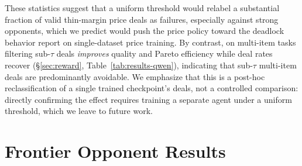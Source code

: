 \documentclass[11pt]{article}
\begin{document}
These statistics suggest that a uniform threshold would relabel a substantial fraction of valid thin-margin price deals as failures, especially against strong opponents, which we predict would push the price policy toward the deadlock behavior \citet{liu2026instructing} report on single-dataset price training. By contrast, on multi-item tasks filtering sub-$\tau$ deals \emph{improves} quality and Pareto efficiency while deal rates recover (\S\ref{sec:reward}, Table~\ref{tab:results-qwen}), indicating that sub-$\tau$ multi-item deals are predominantly avoidable. We emphasize that this is a post-hoc reclassification of a single trained checkpoint's deals, not a controlled comparison: directly confirming the effect requires training a separate agent under a uniform threshold, which we leave to future work.

\section{Frontier Opponent Results}
\label{app:frontier}
\end{document}
